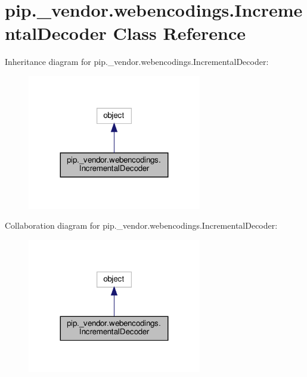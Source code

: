 \hypertarget{classpip_1_1__vendor_1_1webencodings_1_1IncrementalDecoder}{}\section{pip.\+\_\+vendor.\+webencodings.\+Incremental\+Decoder Class Reference}
\label{classpip_1_1__vendor_1_1webencodings_1_1IncrementalDecoder}


Inheritance diagram for pip.\+\_\+vendor.\+webencodings.\+Incremental\+Decoder\+:
\nopagebreak
\begin{figure}[H]
\begin{center}
\leavevmode
\includegraphics[width=215pt]{classpip_1_1__vendor_1_1webencodings_1_1IncrementalDecoder__inherit__graph}
\end{center}
\end{figure}


Collaboration diagram for pip.\+\_\+vendor.\+webencodings.\+Incremental\+Decoder\+:
\nopagebreak
\begin{figure}[H]
\begin{center}
\leavevmode
\includegraphics[width=215pt]{classpip_1_1__vendor_1_1webencodings_1_1IncrementalDecoder__coll__graph}
\end{center}
\end{figure}
